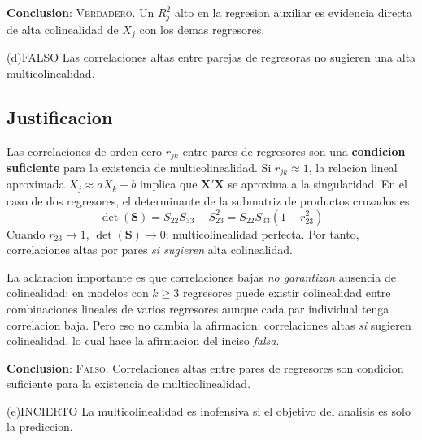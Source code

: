 \documentclass[12pt, letterpaper]{article}
\theoremstyle{remark}
\begin{document}
\textbf{Conclusion}: \textsc{Verdadero}. Un $R^2_j$ alto en la regresion
auxiliar es evidencia directa de alta colinealidad de $X_j$ con los demas
regresores.

\bigskip

\begin{verdict}{(d)}{FALSO}
  Las correlaciones altas entre parejas de regresoras no sugieren una alta
  multicolinealidad.
\end{verdict}

\subsection*{Justificacion}

Las correlaciones de orden cero $r_{jk}$ entre pares de regresores son una
\textbf{condicion suficiente} para la existencia de multicolinealidad.
Si $r_{jk} \approx 1$, la relacion lineal aproximada $X_j \approx aX_k + b$
implica que $\mathbf{X'X}$ se aproxima a la singularidad. En el caso de
dos regresores, el determinante de la submatriz de productos cruzados es:
\begin{equation}
  \det(\mathbf{S}) = S_{22}S_{33} - S_{23}^2
                   = S_{22}S_{33}(1 - r_{23}^2)
  \label{eq:det_S}
\end{equation}
Cuando $r_{23} \to 1$, $\det(\mathbf{S}) \to 0$: multicolinealidad perfecta.
Por tanto, correlaciones altas por pares \emph{si sugieren} alta colinealidad.

La aclaracion importante es que correlaciones bajas \emph{no garantizan} ausencia
de colinealidad: en modelos con $k \geq 3$ regresores puede existir colinealidad
entre combinaciones lineales de varios regresores aunque cada par individual
tenga correlacion baja. Pero eso no cambia la afirmacion: correlaciones altas
\emph{si} sugieren colinealidad, lo cual hace la afirmacion del inciso \emph{falsa}.

\textbf{Conclusion}: \textsc{Falso}. Correlaciones altas entre pares de
regresores son condicion suficiente para la existencia de multicolinealidad.

\bigskip

\begin{verdict}{(e)}{INCIERTO}
  La multicolinealidad es inofensiva si el objetivo del analisis es solo la
  prediccion.
\end{verdict}
\end{document}
